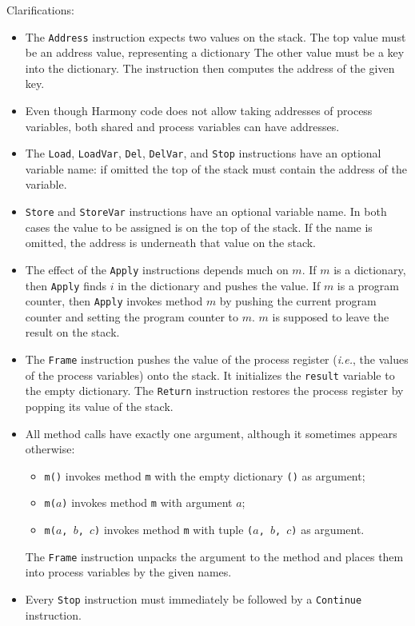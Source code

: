 \documentclass{report}
\begin{document}
\newpage
Clarifications:
\begin{itemize}
\item The \texttt{Address} instruction expects two values on the stack.
The top value must be an address value, representing a dictionary 
The other value must be a key into the dictionary.
The instruction then computes the address of the given key.
\item Even though Harmony code does not allow taking addresses of process variables, both
shared and process variables can have addresses.
\item The \texttt{Load}, \texttt{LoadVar}, \texttt{Del}, \texttt{DelVar},
and \texttt{Stop} instructions have an optional
variable name: if omitted the top of the stack must contain the address of
the variable.
\item \texttt{Store} and \texttt{StoreVar} instructions have an optional
variable name.  In both cases the value to be assigned is on the top
of the stack.  If the name is omitted, the address is underneath that
value on the stack.
\item The effect of the \texttt{Apply} instructions depends much on $m$.
If $m$ is a dictionary, then \texttt{Apply} finds $i$ in the dictionary
and pushes the value.
If $m$ is a program counter, then \texttt{Apply} invokes method $m$ by
pushing the current program counter and setting the program counter to
$m$.  $m$ is supposed to leave the result on the stack.
\item The \texttt{Frame} instruction pushes the value of the process
register (\emph{i.e.}, the values of the process variables) onto the
stack.  It initializes the \texttt{result} variable to the empty dictionary.
The \texttt{Return} instruction restores the process register by popping
its value of the stack.
\item All method calls have exactly one argument, although it sometimes
appears otherwise:
\begin{itemize}
\item \texttt{m()} invokes method \texttt{m} with the empty dictionary \texttt{()} as argument;
\item \texttt{m($a$)} invokes method \texttt{m} with argument $a$;
\item \texttt{m($a$, $b$, $c$)} invokes method \texttt{m} with tuple \texttt{($a$, $b$, $c$)} as argument.
\end{itemize}
The \texttt{Frame} instruction unpacks the argument to the method and places them into process variables by the given names.
\item Every \texttt{Stop} instruction must immediately be followed by a 
\texttt{Continue} instruction.
\end{itemize}
\end{document}
